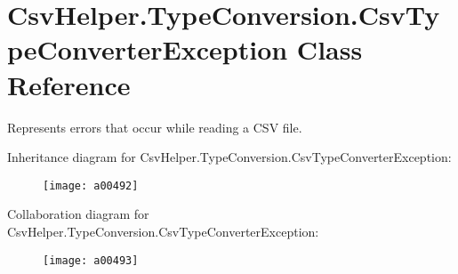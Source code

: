 \hypertarget{a00079}{\section{Csv\-Helper.\-Type\-Conversion.\-Csv\-Type\-Converter\-Exception Class Reference}
\label{a00079}
}


Represents errors that occur while reading a C\-S\-V file.  




Inheritance diagram for Csv\-Helper.\-Type\-Conversion.\-Csv\-Type\-Converter\-Exception\-:
\nopagebreak
\begin{figure}[H]
\begin{center}
\leavevmode
\texttt{[image: a00492]}
\end{center}
\end{figure}


Collaboration diagram for Csv\-Helper.\-Type\-Conversion.\-Csv\-Type\-Converter\-Exception\-:
\nopagebreak
\begin{figure}[H]
\begin{center}
\leavevmode
\texttt{[image: a00493]}
\end{center}
\end{figure}
